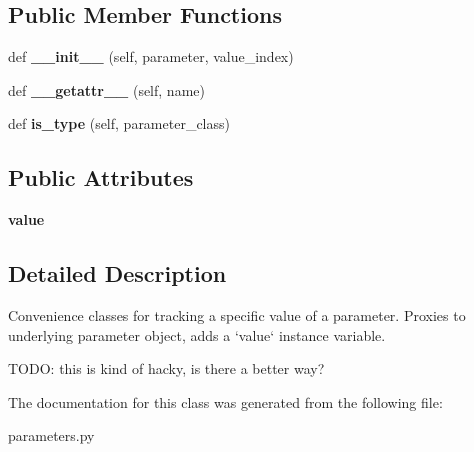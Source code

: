 \subsection*{Public Member Functions}
\begin{DoxyCompactItemize}
\item 
\mbox{\label{classcodar_1_1cheetah_1_1parameters_1_1_parameter_value_ae19c1175ff199c5405518564ec81fa56}} 
def {\bfseries \+\_\+\+\_\+init\+\_\+\+\_\+} (self, parameter, value\+\_\+index)
\item 
\mbox{\label{classcodar_1_1cheetah_1_1parameters_1_1_parameter_value_a984544b6535a16032e725c503f9cba38}} 
def {\bfseries \+\_\+\+\_\+getattr\+\_\+\+\_\+} (self, name)
\item 
\mbox{\label{classcodar_1_1cheetah_1_1parameters_1_1_parameter_value_aad9f920a002859ecec18f5f1ef6085e0}} 
def {\bfseries is\+\_\+type} (self, parameter\+\_\+class)
\end{DoxyCompactItemize}
\subsection*{Public Attributes}
\begin{DoxyCompactItemize}
\item 
\mbox{\label{classcodar_1_1cheetah_1_1parameters_1_1_parameter_value_a270382b19fffc9efa6dd17119b8e1ba8}} 
{\bfseries value}
\end{DoxyCompactItemize}


\subsection{Detailed Description}
\begin{DoxyVerb}Convenience classes for tracking a specific value of a parameter.
Proxies to underlying parameter object, adds a `value` instance
variable.

TODO: this is kind of hacky, is there a better way?
\end{DoxyVerb}
 

The documentation for this class was generated from the following file\+:\begin{DoxyCompactItemize}
\item 
parameters.\+py\end{DoxyCompactItemize}
